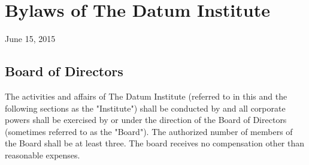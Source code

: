 \textit{}\section{Bylaws of The Datum Institute}

June 15, 2015

\subsection{Board of Directors}

The activities and affairs of The Datum Institute (referred to in this and the following sections as the "Institute") shall be conducted by and all corporate powers shall be exercised by or under the direction of the Board of Directors (sometimes referred to as the "Board"). The authorized number of members of the Board shall be at least three. The board receives no compensation other than reasonable expenses. 

